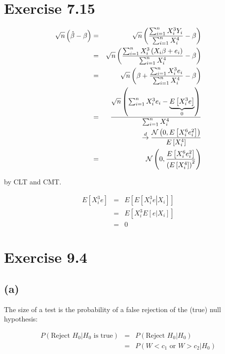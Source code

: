 \documentclass{article}
\begin{document}
\section*{Exercise 7.15}

\begin{eqnarray*}
\sqrt{n}\left( \hat{\beta}-\beta \right)  &=&\sqrt{n}\left( \frac{%
\sum_{i=1}^{n}X_{i}^{3}Y_{i}}{\sum_{i=1}^{n}X_{i}^{4}}-\beta \right)  \\
&=&\sqrt{n}\left( \frac{\sum_{i=1}^{n}X_{i}^{3}\left( X_{i}\beta
+e_{i}\right) }{\sum_{i=1}^{n}X_{i}^{4}}-\beta \right)  \\
&=&\sqrt{n}\left( \beta +\frac{\sum_{i=1}^{n}X_{i}^{3}e_{i}}{%
\sum_{i=1}^{n}X_{i}^{4}}-\beta \right)  \\
&=&\frac{\sqrt{n}\left( \sum_{i=1}^{n}X_{i}^{3}e_{i}-\underset{0}{%
\underbrace{E\left[ X_{i}^{3}e\right] }}\right) }{\sum_{i=1}^{n}X_{i}^{4}} \\
&&\overset{d}{\rightarrow }\frac{\mathcal{N}\left( 0,E\left[
X_{i}^{6}e_{i}^{2}\right] \right) }{E\left[ X_{i}^{4}\right] } \\
&=&\mathcal{N}\left( 0,\frac{E\left[ X_{i}^{6}e_{i}^{2}\right] }{\left( E%
\left[ X_{i}^{4}\right] \right) ^{2}}\right) 
\end{eqnarray*}

by CLT and CMT. 

\begin{eqnarray*}
E\left[ X_{i}^{3}e\right]  &=&E\left[ E\left[ \left. X_{i}^{3}e\right\vert
X_{i}\right] \right]  \\
&=&E\left[ X_{i}^{3}E\left[ \left. e\right\vert X_{i}\right] \right]  \\
&=&0
\end{eqnarray*}

\section*{Exercise 9.4}

\subsection*{(a)}

The size of a test is the probability of a false rejection of the (true)
null hypothesis:

\begin{eqnarray*}
P\left( \left. \text{Reject }H_{0}\right\vert H_{0}\text{ is true}\right)
&=&P\left( \left. \text{Reject }H_{0}\right\vert H_{0}\right) \\
&=&P\left( \left. W<c_{1} \text{ or } W>c_{2}\right\vert H_{0}\right)
\end{eqnarray*}
\end{document}
